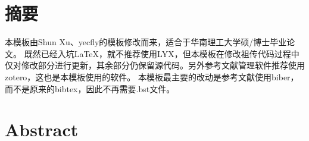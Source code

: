 \chapter{摘\texorpdfstring{\quad}{}要}
	本模板由Shun Xu\cite{_}、yecfly\cite{_a}的模板修改而来，适合于华南理工大学硕/博士毕业论文。
	既然已经入坑LaTeX，就不推荐使用LYX，但本模板在修改祖传代码过程中仅对修改部分进行更新，其余部分仍保留源代码。另外参考文献管理软件推荐使用zotero，这也是本模板使用的软件。
	本模板最主要的改动是参考文献使用biber，而不是原来的bibtex，因此不再需要.bst文件。


\chapter{Abstract}
	

